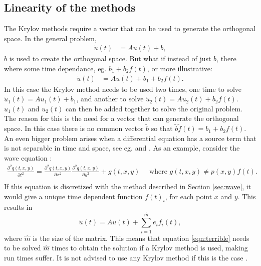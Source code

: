 \subsection{Linearity of the methods} %
The Krylov methods require a vector that can be used to generate the orthogonal space. In the general problem,
\begin{equation*}
\begin{aligned}
\dot{u}(t) &= Au(t) + b,
\end{aligned}
\end{equation*} 
$b$ is used to create the orthogonal space. But what if instead of just $b$, there where some time dependance, eg. $b_1 + b_2f(t)$, or more illustrative:
\begin{equation*}
\begin{aligned}
\dot{u}(t) &= Au(t) + b_1 + b_2 f(t).
\end{aligned}
\end{equation*} 
In this case the Krylov method needs to be used two times, one time to solve $ \dot{u}_1(t) = Au_1(t) + b_1 $, and another to solve $ \dot{u}_2(t) = Au_2(t) + b_2f(t) $. $u_1(t)$ and $u_2(t)$ can then be added together to solve the original problem.
The reason for this is the need for a vector that can generate the orthogonal space. In this case there is no common vector $\tilde{b}$ so that $\tilde{b} \tilde{f}(t) = b_1 +b_2 f(t)$. \\

\noindent An even bigger problem arises when a differential equation has a source term that is not separable in time and space, see eg. \cite{elena} and \cite{min}. %
As an example, consider the wave equation \cite{waveequ}:
\begin{equation*}
\begin{aligned}
\frac{\partial^2 q(t,x,y)}{\partial t^2} = \frac{\partial^2 q(t,x,y)}{\partial x^2 } \frac{\partial^2 q(t,x,y)}{\partial y^2 } + g(t,x,y) \quad \text{ where } g(t,x,y) \neq p(x,y) f(t). \\
\end{aligned}
\end{equation*}
If this equation is discretized with the method described in Section \ref{sec:wave}, it would give a unique time dependent function $f(t)_i$, for each point $x$ and $y$. This results in
\begin{equation} \label{eqn:terrible}
\dot{u}(t) = A u(t) + \sum \limits_{i = 1}^{\hat{m}} e_i f_i(t),
\end{equation}
where $\hat{m}$ is the size of the matrix. 
This means that equation \eqref{eqn:terrible} needs to be solved $\hat{m}$ times to obtain the solution if a Krylov method is used, making run times suffer. It is not advised to use any Krylov method if this is the case \cite{min}.


